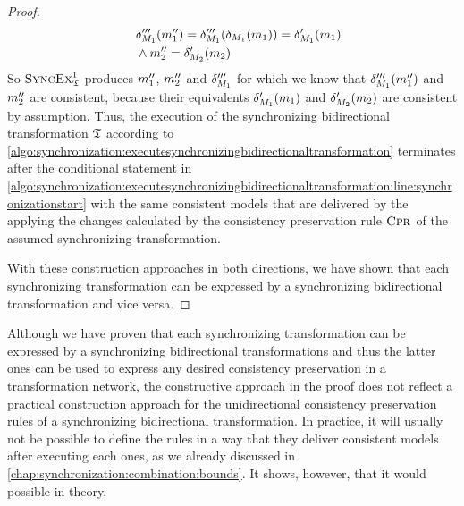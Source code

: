 \begin{proof}
\begin{align*}
        & \formulaskip
        \change{\metamodel{M}{1}}'''(\model{m}{1}'') = %
        \change{\metamodel{M}{1}}'''(\change{\metamodel{M}{1}}(\model{m}{1})) = %
        \change{\metamodel{M}{1}}'(\model{m}{1}) \\
        & \formulaskip
        \land
        \model{m}{2}'' = \change{\metamodel{M}{2}}'(\model{m}{2})
    \end{align*}
    So $\textsc{SyncEx}_{\mathfrak{T}}^1$ produces $m_{1}''$, $m_{2}''$ and $\delta_{M_{1}}'''$ for which we know that $\delta_{M_{1}}'''(m_{1}'')$ and $m_{2}''$ are consistent, because their equivalents $\delta_{M_{1}}'(m_{1})$ and $\delta_{M_{2}}'(m_{2})$ are consistent by assumption.
    Thus, the execution of the synchronizing bidirectional transformation $\mathfrak{T}$ according to \autoref{algo:synchronization:executesynchronizingbidirectionaltransformation} terminates after the conditional statement in \autoref{algo:synchronization:executesynchronizingbidirectionaltransformation:line:synchronizationstart} with the same consistent models that are delivered by the applying the changes calculated by the consistency preservation rule $\textsc{Cpr}_{}$ of the assumed synchronizing transformation.

    With these construction approaches in both directions, we have shown that each synchronizing transformation can be expressed by a synchronizing bidirectional transformation and vice versa.
\end{proof}

Although we have proven that each synchronizing transformation can be expressed by a synchronizing bidirectional transformations and thus the latter ones can be used to express any desired consistency preservation in a transformation network, the constructive approach in the proof does not reflect a practical construction approach for the unidirectional consistency preservation rules of a synchronizing bidirectional transformation.
In practice, it will usually not be possible to define the rules in a way that they deliver consistent models after executing each ones, as we already discussed in \autoref{chap:synchronization:combination:bounds}.
It shows, however, that it would possible in theory.


